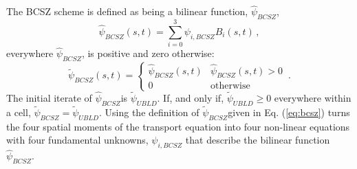 \documentclass{mc2015}
\newcommand{\benum}{\begin{equation}} 			%
\newcommand{\eenum}{\end{equation}}
\newcommand{\eqt}[1]{Eq. (\ref{#1})}  %
\newcommand{\B}[1]{\ensuremath{{B_{#1} }}}
\newcommand{\BCSZ}{\ensuremath{\widetilde{\psi}_{BCSZ}}}
\newcommand{\BCSZH}{\ensuremath{\widehat{\psi}_{BCSZ}}}
\newcommand{\pec}{\, ,}
\newcommand{\pep}{\, .}
\begin{document}
The BCSZ scheme is defined as being a bilinear function, \BCSZH, 
\benum
\BCSZH(s,t) = \sum_{i=0}^3{\psi_{i,BCSZ} \B{i}(s,t)} \pec
\eenum
everywhere \BCSZH, is positive and zero otherwise:
\benum
\BCSZ(s,t) = \left \{ \begin{array}{ll}
\BCSZH(s,t) & \BCSZH(s,t) > 0 \\
0	& \text{otherwise}
\end{array}
\right. \pep
\label{eq:bcsz}
\eenum
The initial iterate of \BCSZH is $\widetilde{\psi}_{UBLD}$.  If, and only if, $\widetilde{\psi}_{UBLD} \geq 0 $ everywhere within a cell, $\BCSZ = \widetilde{\psi}_{UBLD}$.
Using the definition of \BCSZ given in \eqt{eq:bcsz} turns the four spatial moments of the transport equation into four non-linear equations with four fundamental unknowns, $\psi_{i,BCSZ}$ that describe the bilinear function \BCSZH.
\end{document}
